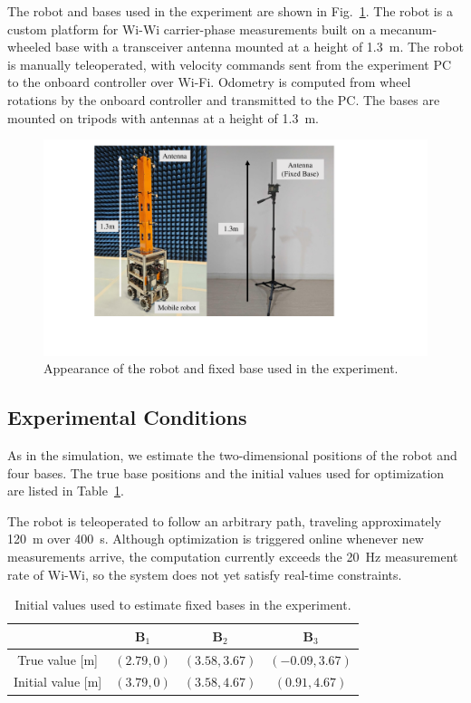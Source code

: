 \documentclass[conference]{IEEEtran}
\begin{document}
The robot and bases used in the experiment are shown in Fig.~\ref{fig:robot}.
The robot is a custom platform for Wi-Wi carrier-phase measurements built on a mecanum-wheeled base with a transceiver antenna mounted at a height of 1.3~m.
The robot is manually teleoperated, with velocity commands sent from the experiment PC to the onboard controller over Wi-Fi.
Odometry is computed from wheel rotations by the onboard controller and transmitted to the PC.
The bases are mounted on tripods with antennas at a height of 1.3~m.

\begin{figure}
    \centering
    \includegraphics[width=0.95\linewidth]{figures/robot}
    \caption{Appearance of the robot and fixed base used in the experiment.}
    \label{fig:robot}
\end{figure}

\subsection{Experimental Conditions}
As in the simulation, we estimate the two-dimensional positions of the robot and four bases.
The true base positions and the initial values used for optimization are listed in Table~\ref{tab:initial_real}.

The robot is teleoperated to follow an arbitrary path, traveling approximately 120~m over 400~s.
Although optimization is triggered online whenever new measurements arrive, the computation currently exceeds the 20~Hz measurement rate of Wi-Wi, so the system does not yet satisfy real-time constraints.

\begin{table}
    \centering
    \caption{Initial values used to estimate fixed bases in the experiment.}
    \begin{tabular}{|c|c|c|c|}
    \hline
        & $\mathbf{B}_1$ & $\mathbf{B}_2$ & $\mathbf{B}_3$ \\
    \hline
       True value [m]  &$(2.79,0)$  &$(3.58,3.67)$ &$(-0.09,3.67)$ \\
       Initial value [m] &$(3.79,0)$  &$(3.58,4.67)$ &$(0.91,4.67)$ \\
    \hline
    \end{tabular}
    \label{tab:initial_real}
\end{table}
\end{document}
